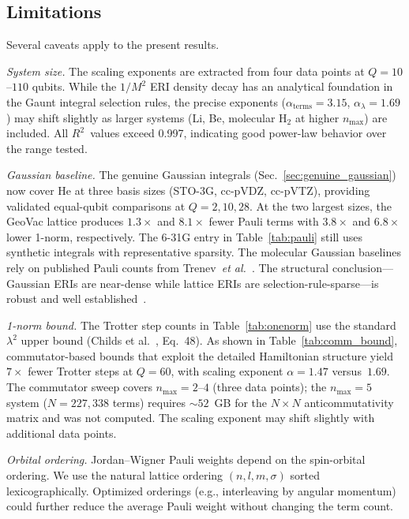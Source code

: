 \documentclass[aps,pra,twocolumn,superscriptaddress,longbibliography]{revtex4-2}
\begin{document}
\subsection{Limitations}
\label{sec:limitations}

Several caveats apply to the present results.

\emph{System size.}  The scaling exponents are extracted from four data
points at $Q = 10$--$110$ qubits.  While the $1/M^2$ ERI density decay
has an analytical foundation in the Gaunt integral selection rules, the
precise exponents ($\alpha_{\mathrm{terms}} = 3.15$,
$\alpha_{\lambda} = 1.69$) may shift slightly as larger systems (Li, Be,
molecular H$_2$ at higher $n_{\max}$) are included.  All $R^2$~values
exceed 0.997, indicating good power-law behavior over the range tested.

\emph{Gaussian baseline.}  The genuine Gaussian integrals
(Sec.~\ref{sec:genuine_gaussian}) now cover He at three basis sizes
(STO-3G, cc-pVDZ, cc-pVTZ), providing validated equal-qubit
comparisons at $Q = 2, 10, 28$.  At the two largest sizes, the
GeoVac lattice produces $1.3\times$ and $8.1\times$ fewer Pauli
terms with $3.8\times$ and $6.8\times$ lower 1-norm, respectively.
The 6-31G entry in Table~\ref{tab:pauli} still uses synthetic
integrals with representative sparsity.  The molecular Gaussian
baselines rely on published Pauli counts from
Trenev~\textit{et al.}~\cite{trenev2025}.  The structural
conclusion---Gaussian ERIs are near-dense while lattice ERIs
are selection-rule-sparse---is robust and well
established~\cite{helgaker2000}.

\emph{1-norm bound.}  The Trotter step counts in Table~\ref{tab:onenorm}
use the standard $\lambda^2$ upper bound (Childs et al.~\cite{childs2021},
Eq.~48).  As shown in Table~\ref{tab:comm_bound}, commutator-based bounds
that exploit the detailed Hamiltonian structure yield $7\times$ fewer Trotter
steps at $Q = 60$, with scaling exponent $\alpha = 1.47$ versus~$1.69$.
The commutator sweep covers $n_{\max} = 2$--$4$ (three data points);
the $n_{\max} = 5$ system ($N = 227{,}338$ terms) requires
$\sim\!52$~GB for the $N \times N$ anticommutativity matrix and was
not computed.  The scaling exponent may shift slightly with additional data
points.

\emph{Orbital ordering.}  Jordan--Wigner Pauli weights depend on the
spin-orbital ordering.  We use the natural lattice ordering
$(n, l, m, \sigma)$ sorted lexicographically.  Optimized orderings (e.g.,
interleaving by angular momentum) could further reduce the average Pauli
weight without changing the term count.
\end{document}
